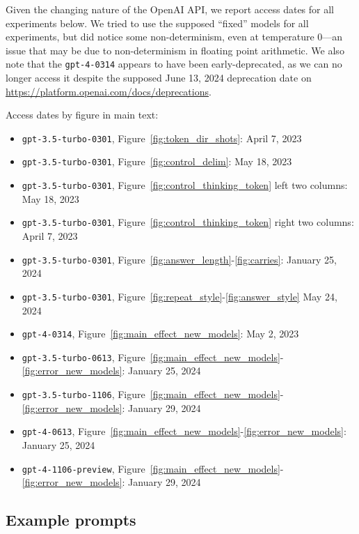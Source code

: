 \documentclass{article}
\theoremstyle{plain}
\theoremstyle{definition}
\theoremstyle{remark}
\begin{document}
Given the changing nature of the OpenAI API, we report access dates for all experiments below. We tried to use the supposed ``fixed'' models for all experiments, but did notice some non-determinism, even at temperature 0---an issue that may be due to non-determinism in floating point arithmetic. We also note that the \texttt{gpt-4-0314} appears to have been early-deprecated, as we can no longer access it despite the supposed June 13, 2024 deprecation date on \url{https://platform.openai.com/docs/deprecations}.

Access dates by figure in main text:
\begin{itemize}
    \item \texttt{gpt-3.5-turbo-0301}, Figure~\ref{fig:token_dir_shots}: April 7, 2023
    \item \texttt{gpt-3.5-turbo-0301}, Figure~\ref{fig:control_delim}: May 18, 2023
    \item \texttt{gpt-3.5-turbo-0301}, Figure~\ref{fig:control_thinking_token} left two columns: May 18, 2023
    \item \texttt{gpt-3.5-turbo-0301}, Figure~\ref{fig:control_thinking_token} right two columns: April 7, 2023
    \item \texttt{gpt-3.5-turbo-0301}, Figure~\ref{fig:answer_length}-\ref{fig:carries}: January 25, 2024
    \item \texttt{gpt-3.5-turbo-0301}, Figure~\ref{fig:repeat_style}-\ref{fig:answer_style} May 24, 2024
    \item \texttt{gpt-4-0314}, Figure~\ref{fig:main_effect_new_models}: May 2, 2023
    \item \texttt{gpt-3.5-turbo-0613}, Figure~\ref{fig:main_effect_new_models}-\ref{fig:error_new_models}: January 25, 2024
     \item \texttt{gpt-3.5-turbo-1106}, Figure~\ref{fig:main_effect_new_models}-\ref{fig:error_new_models}: January 29, 2024
    \item \texttt{gpt-4-0613}, Figure~\ref{fig:main_effect_new_models}-\ref{fig:error_new_models}: January 25, 2024
    \item \texttt{gpt-4-1106-preview}, Figure~\ref{fig:main_effect_new_models}-\ref{fig:error_new_models}: January 29, 2024
\end{itemize}

\subsection{Example prompts}
\label{appx:prompts}
\end{document}
